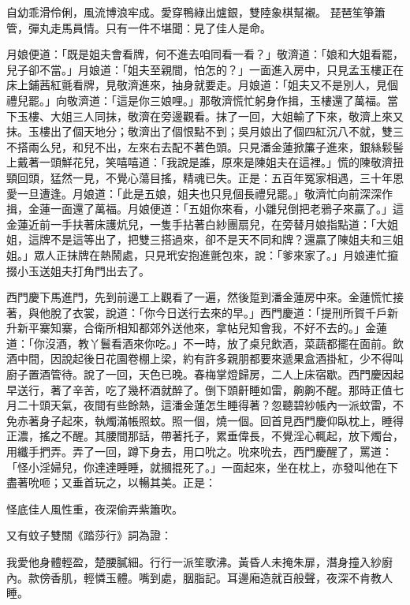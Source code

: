 自幼乖滑伶俐，風流博浪牢成。愛穿鴨綠出爐銀，雙陸象棋幫襯。
琵琶笙箏簫管，彈丸走馬員情。只有一件不堪聞：見了佳人是命。

月娘便道：「既是姐夫會看牌，何不進去咱同看一看？」敬濟道：「娘和大姐看罷，兒子卻不當。」月娘道：「姐夫至親間，怕怎的？」一面進入房中，只見孟玉樓正在床上鋪茜紅氈看牌，見敬濟進來，抽身就要走。月娘道：「姐夫又不是別人，見個禮兒罷。」向敬濟道：「這是你三娘哩。」那敬濟慌忙躬身作揖，玉樓還了萬福。當下玉樓、大姐三人同抹，敬濟在旁邊觀看。抹了一回，大姐輸了下來，敬濟上來又抹。玉樓出了個天地分；敬濟出了個恨點不到；吳月娘出了個四紅沉八不就，雙三不搭兩么兒，和兒不出，左來右去配不著色頭。只見潘金蓮掀簾子進來，銀絲鬏髻上戴著一頭鮮花兒，笑嘻嘻道：「我說是誰，原來是陳姐夫在這裡。」慌的陳敬濟扭頸回頭，猛然一見，不覺心蕩目搖，精魂已失。正是：五百年冤家相遇，三十年恩愛一旦遭逢。月娘道：「此是五娘，姐夫也只見個長禮兒罷。」敬濟忙向前深深作揖，金蓮一面還了萬福。月娘便道：「五姐你來看，小雛兒倒把老鴉子來贏了。」這金蓮近前一手扶著床護炕兒，一隻手拈著白紗團扇兒，在旁替月娘指點道：「大姐姐，這牌不是這等出了，把雙三搭過來，卻不是天不同和牌？還贏了陳姐夫和三姐姐。」眾人正抹牌在熱鬧處，只見玳安抱進氈包來，說：「爹來家了。」月娘連忙攛掇小玉送姐夫打角門出去了。

西門慶下馬進門，先到前邊工上觀看了一遍，然後踅到潘金蓮房中來。金蓮慌忙接著，與他脫了衣裳，說道：「你今日送行去來的早。」西門慶道：「提刑所賀千戶新升新平寨知寨，合衛所相知都郊外送他來，拿帖兒知會我，不好不去的。」金蓮道：「你沒酒，教丫鬟看酒來你吃。」不一時，放了桌兒飲酒，菜蔬都擺在面前。飲酒中間，因說起後日花園卷棚上梁，約有許多親朋都要來遞果盒酒掛紅，少不得叫廚子置酒管待。說了一回，天色已晚。春梅掌燈歸房，二人上床宿歇。西門慶因起早送行，著了辛苦，吃了幾杯酒就醉了。倒下頭鼾睡如雷，齁齁不醒。那時正值七月二十頭天氣，夜間有些餘熱，這潘金蓮怎生睡得著？忽聽碧紗帳內一派蚊雷，不免赤著身子起來，執燭滿帳照蚊。照一個，燒一個。回首見西門慶仰臥枕上，睡得正濃，搖之不醒。其腰間那話，帶著托子，累垂偉長，不覺淫心輒起，放下燭台，用纖手捫弄。弄了一回，蹲下身去，用口吮之。吮來吮去，西門慶醒了，罵道：「怪小淫婦兒，你達達睡睡，就摑掍死了。」一面起來，坐在枕上，亦發叫他在下盡著吮咂；又垂首玩之，以暢其美。正是：

怪底佳人風性重，夜深偷弄紫簫吹。

又有蚊子雙關《踏莎行》詞為證：

我愛他身體輕盈，楚腰膩細。行行一派笙歌沸。黃昏人未掩朱扉，潛身撞入紗廚內。款傍香肌，輕憐玉體。嘴到處，胭脂記。耳邊廂造就百般聲，夜深不肯教人睡。

